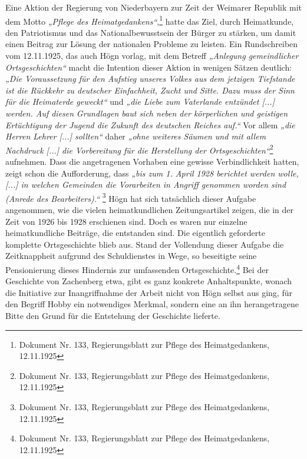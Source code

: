 \documentclass[a4paper]{article}
\newcommand\textstyleZitate[1]{\textit{#1}}
\begin{document}
Eine Aktion der Regierung von Niederbayern zur Zeit der Weimarer
Republik mit dem Motto \textstyleZitate{„Pflege des
Heimatgedankens“},\footnote{ Dokument Nr. 133, Regierungsblatt zur
Pflege des Heimatgedankens, 12.11.1925} hatte das Ziel, durch
Heimatkunde, den Patriotismus und das Nationalbewusstsein der Bürger zu
stärken, um damit einen Beitrag zur Lösung der nationalen Probleme zu
leisten. Ein Rundschreiben vom 12.11.1925, das auch Högn vorlag, mit
dem Betreff \textstyleZitate{„Anlegung gemeindlicher Ortsgeschichten“}
macht die Intention dieser Aktion in wenigen Sätzen deutlich:
\textstyleZitate{„Die Voraussetzung für den Aufstieg unseres Volkes aus
dem jetzigen Tiefstande ist die Rückkehr zu deutscher Einfachheit,
Zucht und Sitte. Dazu muss der Sinn für die Heimaterde geweckt“} und
\textstyleZitate{„die Liebe zum Vaterlande entzündet [...] werden. Auf
diesen }\textstyleZitate{Grundlagen baut sich neben der körperlichen
und geistigen Ertüchtigung der Jugend die Zukunft des deutschen Reiches
auf.“} Vor allem \textstyleZitate{„die Herren Lehrer [...] sollten“
}daher\textstyleZitate{ „ohne weiteres Säumen und mit allem Nachdruck
[...] die Vorbereitung für die Herstellung der
Ortsgeschichten“}\footnote{ Dokument Nr. 133, Regierungsblatt zur
Pflege des Heimatgedankens, 12.11.1925} aufnehmen. Dass die
angetragenen Vorhaben eine gewisse Verbindlichkeit hatten, zeigt schon
die Aufforderung, dass \textstyleZitate{„bis zum 1. April 1928
berichtet werden wolle, [...] in welchen Gemeinden die Vorarbeiten in
Angriff genommen worden sind (Anrede des Bearbeiters).“ }\footnote{
Dokument Nr. 133, Regierungsblatt zur Pflege des Heimatgedankens,
12.11.1925} Högn hat sich tatsächlich dieser Aufgabe angenommen, wie
die vielen heimatkundlichen Zeitungsartikel zeigen, die in der Zeit von
1926 bis 1928 erschienen sind. Doch es waren nur einzelne
heimatkundliche Beiträge, die entstanden sind. Die eigentlich
geforderte komplette Ortsgeschichte blieb aus. Stand der Vollendung
dieser Aufgabe die Zeitknappheit aufgrund des Schuldienstes in Wege, so
beseitigte seine Pensionierung dieses Hindernis zur umfassenden
Ortsgeschichte.\footnote{ Dokument Nr. 133, Regierungsblatt zur Pflege
des Heimatgedankens, 12.11.1925} Bei der Geschichte von Zachenberg
etwa, gibt es ganz konkrete Anhaltspunkte, wonach die Initiative zur
Inangriffnahme der Arbeit nicht von Högn selbst aus ging, für den
Begriff Hobby ein notwendiges Merkmal, sondern eine an ihn
herangetragene Bitte den Grund für die Entstehung der Geschichte
lieferte.
\end{document}
